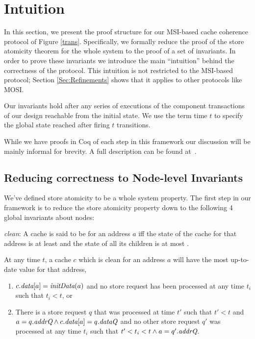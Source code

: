 \section{Intuition}
\label{Sec:ProofStructure}

In this section, we present the proof structure for our MSI-based cache
coherence protocol of Figure \ref{trans}. Specifically, we formally reduce the
proof of the store atomicity theorem for the whole system to the proof of a set
of invariants. In order to prove these invariants we introduce the main
``intuition'' behind the correctness of the protocol. This intuition is not
restricted to the MSI-based protocol; Section \ref{Sec:Refinements} shows that
it applies to other protocols like MOSI.

Our invariants hold after any series of executions of the component
transactions of our design reachable from the initial state. We use
the term time $t$ to specify the global state reached after firing $t$
transitions.

While we have proofs in Coq of each step in this framework our
discussion will be mainly informal for brevity. A full description can
be found at~.

\subsection{Reducing correctness to Node-level Invariants}

We've defined store atomicity to be a whole system property. The first step in
our framework is to reduce the store atomicity property down to the following 4
global invariants about nodes:

\begin{defn}
\textit{clean}: A cache is said to be \clean{} for an address $a$ iff
the state of the cache for that address is at least \Sh{} and the
state of all its children is at most \Sh.
\end{defn}
\begin{inv}
At any time $t$, a cache $c$ which is clean for an address $a$ will have the most
up-to-date value for that address, \ie{}
\begin{enumerate}
\item $c.\textit{data}[a] = \textit{initData}(a)$ and no store request has been
  processed at any time $t_i$ such that $t_i < t$, or
\item There is a store request $q$ that was processed at time $t'$ such that
$t' < t$ and $a = q.\textit{addrQ} \wedge c.\textit{data}[a] = q.\textit{dataQ}$ and no other store
request $q'$ was processed at any time $t_i$ such that $t' < t_i < t \wedge a =
q'.\textit{addrQ}$.
\end{enumerate}
\label{latestValue}
\end{inv}

